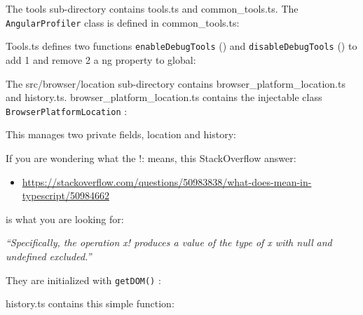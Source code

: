 

The tools sub-directory contains tools.ts and common\_tools.ts. The
\texttt{AngularProfiler}
class is defined in common\_tools.ts:



Tools.ts defines two functions
\texttt{enableDebugTools}
() and
\texttt{disableDebugTools}
() to add
1
and remove
2
a ng property to global:



The src/browser/location sub-directory contains browser\_platform\_location.ts and
history.ts. browser\_platform\_location.ts contains the injectable class
\texttt{BrowserPlatformLocation}
:



This manages two private fields, location and history:



If you are wondering what the !: means, this StackOverflow answer:

\begin{itemize}
  \item \url{https://stackoverflow.com/questions/50983838/what-does-mean-in-typescript/50984662}
\end{itemize}

is what you are looking for:

\emph{“Specifically, the operation x! produces a value of the type of x with null}
\emph{and undefined excluded.”}

They are initialized with
\texttt{getDOM()}
:



history.ts contains this simple function:


